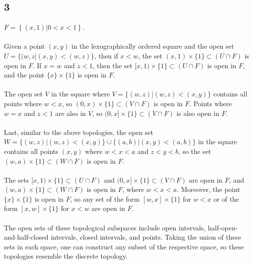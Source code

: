 \documentclass{article}
\begin{document}
\subsection*{3} 
$F = \left\lbrace \left( x, 1 \right) | 0 < x < 1 \right\rbrace$.  \\ 
\\ 
Given a point $(x, y)$ in the lexographically ordered square and the open set $U = \{ (w, z | (x, y) < (w, z) \}$, then if 
$x < w$, the set $(x, 1) \times \{1 \} \subset (U \cap F)$ is open in $F$.  If $x = w$ and $z < 1$, then the set 
$[x, 1) \times \{ 1 \} \subset (U \cap F)$ is open in $F$, and the point $\{x\} \times \{1\}$ is open in $F$.\\ 
\\ 
The open set $V$ in the square where $V = \{ (w, z) | (w, z) < (x, y) \}$ contains all points where $w < x$, so 
$(0, x) \times \{1 \} \subset (V \cap F)$ is open in $F$.  Points where $w = x$ and $z < 1$ are also in $V$, 
so $(0, x] \times \{1 \} \subset (V \cap F)$ is also open in $F$. \\ 
\\ 
Last, similar to the above topologies, the open set $W = \{ (w, z) | (w, z) < (x, y) \} \cup \{ (a, b) | (x, y) < (a, b) \}$ 
in the square contains all points $(x, y)$ where $w < x < a$ and $z < y < b$, so the set 
$(w, a) \times \{ 1 \} \subset (W \cap F)$ is open in $F$.\\ 
\\ 
The sets $[x, 1) \times \{ 1 \} \subset (U \cap F)$ and $(0, x] \times \{1 \} \subset (V \cap F)$ are open in $F$, 
and $(w, a) \times \{ 1 \} \subset (W \cap F)$ is open in $F$, where $w < x < a$.  Moreover, the point $\{x\} \times \{1\}$ is open in $F$, 
so any set of the form $[w, x] \times \{1\}$ for $w < x$ or of the form $[x, w]\times \{1\}$ for $x < w$ are open in $F$.\\
\\ 
The open sets of these topological subspaces include open intervals, half-open-and-half-closed intervals, closed intervals, 
and points.  Taking the union of these sets in each space, one can construct any subset of the respective space, so these 
topologies resemble the discrete topology.\\ 
\end{document}
